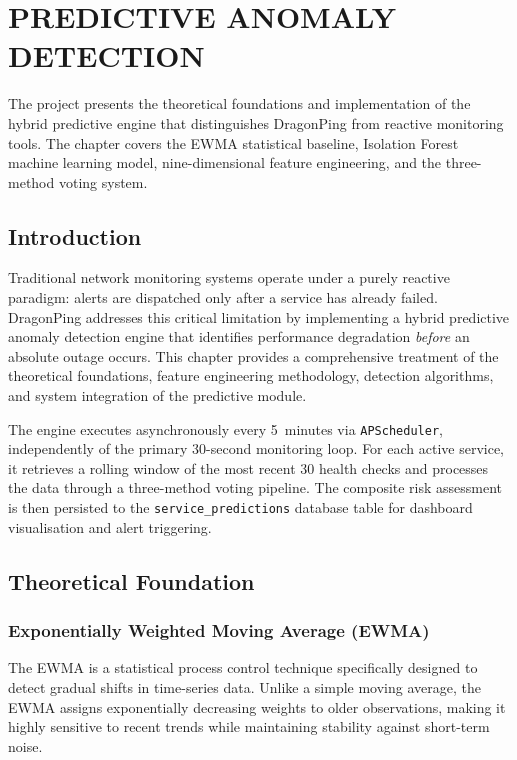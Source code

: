 \documentclass[12pt,a4paper,oneside]{report}
\begin{document}
\chapter{PREDICTIVE ANOMALY DETECTION}

The project presents the theoretical foundations and implementation of the hybrid predictive engine that distinguishes DragonPing from reactive monitoring tools. The chapter covers the EWMA statistical baseline, Isolation Forest machine learning model, nine-dimensional feature engineering, and the three-method voting system.

\section{Introduction}
\noindent Traditional network monitoring systems operate under a purely reactive paradigm: alerts are dispatched only after a service has already failed. DragonPing addresses this critical limitation by implementing a hybrid predictive anomaly detection engine that identifies performance degradation \textit{before} an absolute outage occurs. This chapter provides a comprehensive treatment of the theoretical foundations, feature engineering methodology, detection algorithms, and system integration of the predictive module.

\noindent The engine executes asynchronously every 5~minutes via \texttt{APScheduler}, independently of the primary 30-second monitoring loop. For each active service, it retrieves a rolling window of the most recent 30 health checks and processes the data through a three-method voting pipeline. The composite risk assessment is then persisted to the \texttt{service\_predictions} database table for dashboard visualisation and alert triggering.

\section{Theoretical Foundation}

\subsection{Exponentially Weighted Moving Average (EWMA)}
\noindent The EWMA is a statistical process control technique specifically designed to detect gradual shifts in time-series data. Unlike a simple moving average, the EWMA assigns exponentially decreasing weights to older observations, making it highly sensitive to recent trends while maintaining stability against short-term noise.
\end{document}
